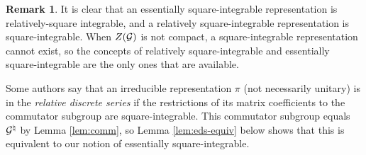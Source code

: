 \documentclass{article}
\theoremstyle{definition}
\newtheorem{rem}[thm]{Remark}
\numberwithin{equation}{section}
\renewcommand{\-}{\hyp{}}
\begin{document}
\begin{rem}
It is clear that an essentially square-integrable representation is relatively-square integrable, and a relatively square-integrable representation is square-integrable. When $Z(\mathcal{G})$ is not compact, a square-integrable representation cannot exist, so the concepts of relatively square-integrable and essentially square-integrable are the only ones that are available.

Some authors say that an irreducible representation $\pi$ (not necessarily unitary) is in the \emph{relative discrete series} if the restrictions of its matrix coefficients to the commutator subgroup are square-integrable. This commutator subgroup equals $\mathcal{G}^\natural$ by Lemma \ref{lem:comm}, so Lemma \ref{lem:eds-equiv} below shows that this is equivalent to our notion of essentially square-integrable.
\end{rem}
\end{document}
